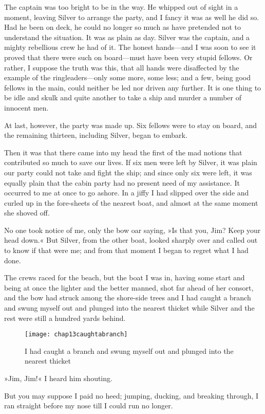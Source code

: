 The captain was too bright to be in the way. He whipped out of sight in a moment, leaving Silver to arrange the party, and I fancy it was as well he did so. Had he been on deck, he could no longer so much as have pretended not to understand the situation. It was as plain as day. Silver was the captain, and a mighty rebellious crew he had of it. The honest hands—and I was soon to see it proved that there were such on board—must have been very stupid fellows. Or rather, I suppose the truth was this, that all hands were disaffected by the example of the ringleaders—only some more, some less; and a few, being good fellows in the main, could neither be led nor driven any further. It is one thing to be idle and skulk and quite another to take a ship and murder a number of innocent men.

At last, however, the party was made up. Six fellows were to stay on board, and the remaining thirteen, including Silver, began to embark.

Then it was that there came into my head the first of the mad notions that contributed so much to save our lives. If six men were left by Silver, it was plain our party could not take and fight the ship; and since only six were left, it was equally plain that the cabin party had no present need of my assistance. It occurred to me at once to go ashore. In a jiffy I had slipped over the side and curled up in the fore-sheets of the nearest boat, and almost at the same moment she shoved off.

No one took notice of me, only the bow oar saying, »Is that you, Jim? Keep your head down.« But Silver, from the other boat, looked sharply over and called out to know if that were me; and from that moment I began to regret what I had done.

 

The crews raced for the beach, but the boat I was in, having some start and being at once the lighter and the better manned, shot far ahead of her consort, and the bow had struck among the shore-side trees and I had caught a branch and swung myself out and plunged into the nearest thicket while Silver and the rest were still a hundred yards behind.

 \begin{sidewaysfigure}
\texttt{[image: chap13caughtabranch]}%
\caption[Caught a branch and swung myself out]{I had caught a branch and swung myself out and plunged into the nearest thicket}
\end{sidewaysfigure} 

»Jim, Jim!« I heard him shouting.

But you may suppose I paid no heed; jumping, ducking, and breaking through, I ran straight before my nose till I could run no longer.
\enlargethispage{\baselineskip}